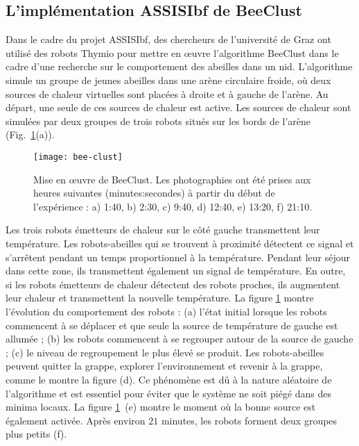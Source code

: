 \subsection{L'implémentation ASSISIbf de BeeClust}

Dans le cadre du projet ASSISIbf, des chercheurs de l'université de Graz ont utilisé des robots Thymio pour mettre en œuvre l'algorithme BeeClust dans le cadre d'une recherche sur le comportement des abeilles dans un nid. L'algorithme simule un groupe de jeunes abeilles dans une arène circulaire froide, où deux sources de chaleur virtuelles sont placées à droite et à gauche de l'arène. Au départ, une seule de ces sources de chaleur est active. Les sources de chaleur sont simulées par deux groupes de trois robots situés sur les bords de l'arène (Fig.~\ref{fig.beeclust-demo}(a)).

\begin{figure}
\begin{center}
\texttt{[image: bee-clust]}
\end{center}
\caption{Mise en œuvre de BeeClust. Les photographies ont été prises aux heures suivantes (minutes:secondes) à partir du début de l'expérience : a) 1:40, b) 2:30, c) 9:40, d) 12:40, e) 13:20, f) 21:10.}
\label{fig.beeclust-demo}
\end{figure}

Les trois robots émetteurs de chaleur sur le côté gauche transmettent leur température. Les robots-abeilles qui se trouvent à proximité détectent ce signal et s'arrêtent pendant un temps proportionnel à la température. Pendant leur séjour dans cette zone, ils transmettent également un signal de température. En outre, si les robots émetteurs de chaleur détectent des robots proches, ils augmentent leur chaleur et transmettent la nouvelle température. La figure \ref{fig.beeclust-demo} montre l'évolution du comportement des robots : (a) l'état initial lorsque les robots commencent à se déplacer et que seule la source de température de gauche est allumée ; (b) les robots commencent à se regrouper autour de la source de gauche ; (c) le niveau de regroupement le plus élevé se produit. Les robots-abeilles peuvent quitter la grappe, explorer l'environnement et revenir à la grappe, comme le montre la figure (d). Ce phénomène est dû à la nature aléatoire de l'algorithme et est essentiel pour éviter que le système ne soit piégé dans des minima locaux. La figure \ref{fig.beeclust-demo}~(e) montre le moment où la bonne source est également activée. Après environ $21$ minutes, les robots forment deux groupes plus petits (f).

